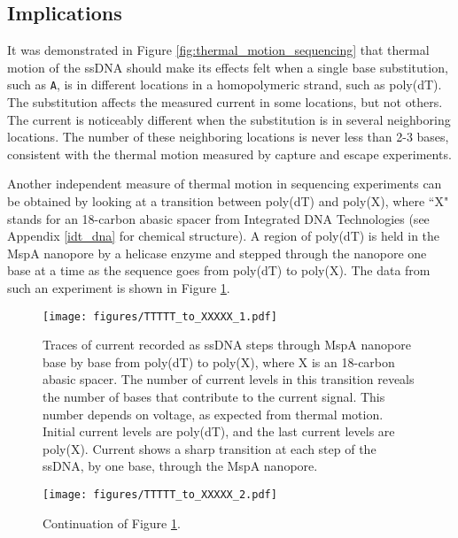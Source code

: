 \subsection{Implications}

It was demonstrated in Figure \ref{fig:thermal_motion_sequencing} that thermal motion of the ssDNA should make its effects felt when a single base substitution, such as \texttt{A}, is in different locations in a homopolymeric strand, such as poly(dT).  The substitution affects the measured current in some locations, but not others.  The current is noticeably different when the substitution is in several neighboring locations.  The number of these neighboring locations is never less than 2-3 bases, consistent with the thermal motion measured by capture and escape experiments.

Another independent measure of thermal motion in sequencing experiments can be obtained by looking at a transition between poly(dT) and poly(X), where ``X" stands for an 18-carbon abasic spacer from Integrated DNA Technologies (see Appendix \ref{idt_dna} for chemical structure).  A region of poly(dT) is held in the MspA nanopore by a helicase enzyme and stepped through the nanopore one base at a time as the sequence goes from poly(dT) to poly(X).  The data from such an experiment is shown in Figure \ref{fig:thermal_motion_sequencing2}.

\begin{figure}[h]
\begin{centering}
\texttt{[image: figures/TTTTT\_to\_XXXXX\_1.pdf]}
\caption[Thermal motion averaging depends on bias voltage]{Traces of current recorded as ssDNA steps through MspA nanopore base by base from poly(dT) to poly(X), where X is an 18-carbon abasic spacer.  The number of current levels in this transition reveals the number of bases that contribute to the current signal.  This number depends on voltage, as expected from thermal motion.  Initial current levels are poly(dT), and the last current levels are poly(X).  Current shows a sharp transition at each step of the ssDNA, by one base, through the MspA nanopore.}
\label{fig:thermal_motion_sequencing2}
\end{centering}
\end{figure}

\begin{figure}[h]
\begin{centering}
\texttt{[image: figures/TTTTT\_to\_XXXXX\_2.pdf]}
\caption[Thermal motion averaging depends on bias voltage, part 2]{Continuation of Figure \ref{fig:thermal_motion_sequencing2}.}
\label{fig:thermal_motion_sequencing2_2}
\end{centering}
\end{figure}

